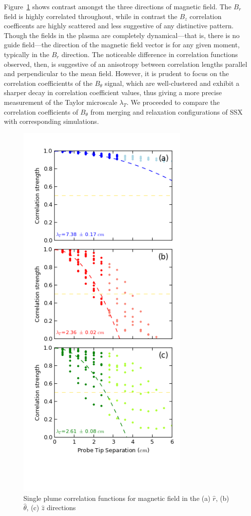 \documentclass[aip,prl,amsmath,amssymb,reprint,superscriptaddress]{revtex4-1} %
\begin{document}
Figure~\ref{fig:brbtbz} shows contrast amongst the three directions of magnetic field. The $B_r$ field is highly correlated throughout, while in contrast the $B_z$ correlation coefficents are highly scattered and less suggestive of any distinctive pattern. Though the fields in the plasma are completely dynamical---that is, there is no guide field---the direction of the magnetic field vector is for any given moment, typically in the $B_{r}$ direction. The noticeable difference in correlation functions observed, then, is suggestive of an anisotropy between correlation lengths parallel and perpendicular to the mean field. However, it is prudent to focus on the correlation coefficientts of the $B_\theta$ signal, which are well-clustered and exhibit a sharper decay in correlation coefficient values, thus giving a more precise measurement of the Taylor microscale $\lambda_T$. We proceeded to compare the correlation coefficients of $B_\theta$ from merging and relaxation configurations of SSX with corresponding simulations. 

\begin{figure}[!htbp]
\centerline{
\includegraphics[width=8.5cm]{Images/brbtbz-081413.png}}
\caption{Single plume correlation functions for magnetic field in the (a) $\hat{r}$, (b) $\hat{\theta}$, (c) $\hat{z}$ directions}
\label{fig:brbtbz}
\end{figure}
\end{document}
